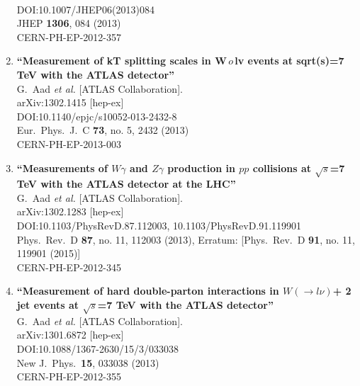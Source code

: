 \documentclass{article}
\begin{document}
\begin{enumerate}
  \\{}DOI:10.1007/JHEP06(2013)084
  \\{}JHEP {\bf 1306}, 084 (2013)
  \\{}CERN-PH-EP-2012-357
\item%
{\bf ``Measurement of kT splitting scales in W$\,	o\,$lv events at sqrt(s)=7 TeV with the ATLAS detector''}
  \\{}G.~Aad {\it et al.} [ATLAS Collaboration].
  \\{}arXiv:1302.1415 [hep-ex]
  \\{}DOI:10.1140/epjc/s10052-013-2432-8
  \\{}Eur.\ Phys.\ J.\ C {\bf 73}, no. 5, 2432 (2013)
  \\{}CERN-PH-EP-2013-003
\item%
{\bf ``Measurements of $W \gamma$ and $Z \gamma$ production in $pp$ collisions at $\sqrt{s}$=7  TeV with the ATLAS detector at the LHC''}
  \\{}G.~Aad {\it et al.} [ATLAS Collaboration].
  \\{}arXiv:1302.1283 [hep-ex]
  \\{}DOI:10.1103/PhysRevD.87.112003, 10.1103/PhysRevD.91.119901
  \\{}Phys.\ Rev.\ D {\bf 87}, no. 11, 112003 (2013), Erratum: [Phys.\ Rev.\ D {\bf 91}, no. 11, 119901 (2015)]
  \\{}CERN-PH-EP-2012-345
\item%
{\bf ``Measurement of hard double-parton interactions in $W(\to l\nu)$+ 2 jet events at $\sqrt{s}$=7 TeV with the ATLAS detector''}
  \\{}G.~Aad {\it et al.} [ATLAS Collaboration].
  \\{}arXiv:1301.6872 [hep-ex]
  \\{}DOI:10.1088/1367-2630/15/3/033038
  \\{}New J.\ Phys.\  {\bf 15}, 033038 (2013)
  \\{}CERN-PH-EP-2012-355

\end{enumerate}
\end{document}
